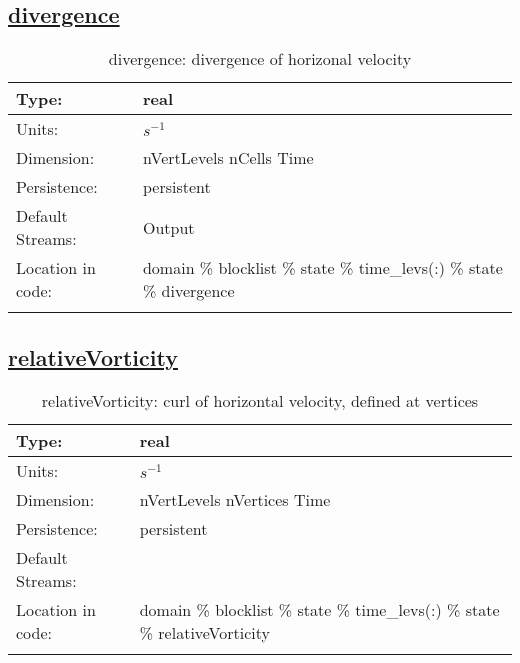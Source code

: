\subsection[divergence]{\hyperref[sec:var_tab_state]{divergence}}
\label{subsec:var_sec_state_divergence}
\begin{center}
\begin{longtable}{| p{2.0in} | p{4.0in} |}
        \hline 
        Type: & real \\
        \hline 
        Units: & $s^{-1}$ \\
        \hline 
        Dimension: & nVertLevels nCells Time \\
        \hline 
        Persistence: & persistent \\
        \hline 
		 Default Streams: & Output  \\
        \hline 
		 Location in code: & domain \% blocklist \% state \% time\_levs(:) \% state \% divergence \\
		 \hline 
    \caption{divergence: divergence of horizonal velocity}
\end{longtable}
\end{center}
\subsection[relativeVorticity]{\hyperref[sec:var_tab_state]{relativeVorticity}}
\label{subsec:var_sec_state_relativeVorticity}
\begin{center}
\begin{longtable}{| p{2.0in} | p{4.0in} |}
        \hline 
        Type: & real \\
        \hline 
        Units: & $s^{-1}$ \\
        \hline 
        Dimension: & nVertLevels nVertices Time \\
        \hline 
        Persistence: & persistent \\
        \hline 
		 Default Streams: &  \\
        \hline 
		 Location in code: & domain \% blocklist \% state \% time\_levs(:) \% state \% relativeVorticity \\
		 \hline 
    \caption{relativeVorticity: curl of horizontal velocity, defined at vertices}
\end{longtable}
\end{center}
